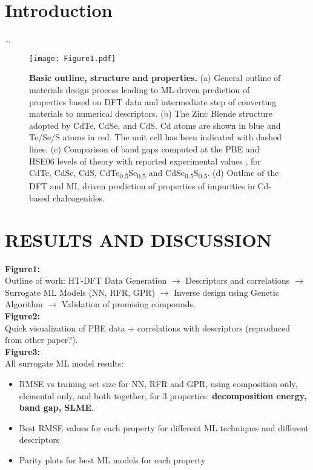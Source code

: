 \documentclass[aip, jmp, amsmath, amssymb, reprint]{revtex4-2}
\begin{document}
\section*{Introduction}
\label{sec:org865a612}
\ldots{}\\

\begin{figure}[htbp]
\centering
\texttt{[image: Figure1.pdf]}
\caption{\label{fig:outline} \textbf{Basic outline, structure and properties.} (a) General outline of materials design process leading to ML-driven prediction of properties based on DFT data and intermediate step of converting materials to numerical descriptors. (b) The Zinc Blende structure adopted by CdTe, CdSe, and CdS. Cd atoms are shown in blue and Te/Se/S atoms in red. The unit cell has been indicated with dashed lines. (c) Comparison of band gaps computed at the PBE and HSE06 levels of theory with reported experimental values \cite{kim-2014-cdses-nanow,swanson-2017-co-sublim}, for CdTe, CdSe, CdS, CdTe\textsubscript{0.5}Se\textsubscript{0.5} and CdSe\textsubscript{0.5}S\textsubscript{0.5}. (d) Outline of the DFT and ML driven prediction of properties of impurities in Cd-based chalcogenides.}
\end{figure}

\section*{RESULTS AND DISCUSSION}
\label{sec:org626c859}
\textbf{Figure1:}\\
Outline of work: HT-DFT Data Generation \(\rightarrow\) Descriptors and
correlations \(\rightarrow\) Surrogate ML Models (NN, RFR, GPR)
\(\rightarrow\) Inverse design using Genetic Algorithm \(\rightarrow\)
Validation of promising compounds.\\
\textbf{Figure2:}\\
Quick visualization of PBE data + correlations with descriptors
(reproduced from other paper?).\\
\textbf{Figure3:}\\
All surrogate ML model results:

\begin{itemize}
\item RMSE vs training set size for NN, RFR and GPR, using composition only,
elemental only, and both together, for 3 properties: \textbf{decomposition
energy, band gap, SLME}.

\item Best RMSE values for each property for different ML techniques and
different descriptors

\item Parity plots for best ML models for each property
\end{itemize}
\end{document}
